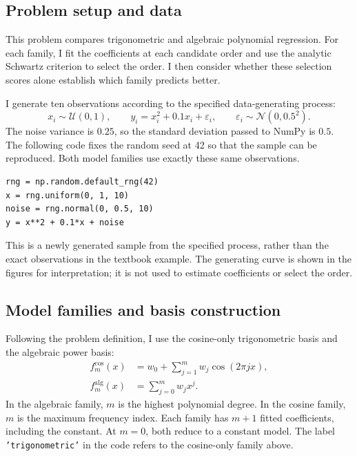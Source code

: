 \documentclass[11pt,a4paper]{article}
\begin{document}
\subsection*{Problem setup and data}
This problem compares trigonometric and algebraic polynomial regression. For each family, I fit the coefficients at each candidate order and use the analytic Schwartz criterion to select the order. I then consider whether these selection scores alone establish which family predicts better.

I generate ten observations according to the specified data-generating process:
\begin{equation}
x_i\sim\mathcal U(0,1),\qquad
y_i=x_i^2+0.1x_i+\varepsilon_i,\qquad
\varepsilon_i\sim\mathcal N(0,0.5^2).
\end{equation}
The noise variance is $0.25$, so the standard deviation passed to NumPy is $0.5$. The following code fixes the random seed at 42 so that the sample can be reproduced. Both model families use exactly these same observations.

\par\addvspace{4pt}
\noindent\begin{minipage}{\linewidth}
\begin{lstlisting}[style=pythoncode,caption={Generating the ten regression observations.}]
rng = np.random.default_rng(42)
x = rng.uniform(0, 1, 10)
noise = rng.normal(0, 0.5, 10)
y = x**2 + 0.1*x + noise
\end{lstlisting}
\end{minipage}\par\addvspace{4pt}

This is a newly generated sample from the specified process, rather than the exact observations in the textbook example. The generating curve is shown in the figures for interpretation; it is not used to estimate coefficients or select the order.

\subsection*{Model families and basis construction}
Following the problem definition, I use the cosine-only trigonometric basis and the algebraic power basis:
\begin{align}
f_m^{\mathrm{cos}}(x)&=w_0+\sum_{j=1}^{m}w_j\cos(2\pi jx),\\
f_m^{\mathrm{alg}}(x)&=\sum_{j=0}^{m}w_jx^j.
\end{align}
In the algebraic family, $m$ is the highest polynomial degree. In the cosine family, $m$ is the maximum frequency index. Each family has $m+1$ fitted coefficients, including the constant. At $m=0$, both reduce to a constant model. The label \texttt{'trigonometric'} in the code refers to the cosine-only family above.
\end{document}
